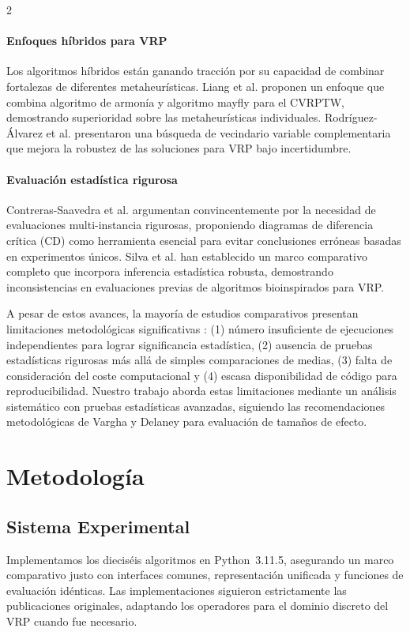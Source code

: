 \documentclass[10pt,a4paper]{extarticle}
\begin{document}
{\begin{multicols}{2}
\paragraph{Enfoques híbridos para VRP} Los algoritmos híbridos están ganando tracción por su capacidad de combinar fortalezas de diferentes metaheurísticas. Liang et al. \cite{Liang2023HHMM} proponen un enfoque que combina algoritmo de armonía y algoritmo mayfly para el CVRPTW, demostrando superioridad sobre las metaheurísticas individuales. Rodríguez-Álvarez et al. \cite{Rodriguez2024CSVNS} presentaron una búsqueda de vecindario variable complementaria que mejora la robustez de las soluciones para VRP bajo incertidumbre.

\paragraph{Evaluación estadística rigurosa} Contreras-Saavedra et al. \cite{Contreras2024CD} argumentan convincentemente por la necesidad de evaluaciones multi-instancia rigurosas, proponiendo diagramas de diferencia crítica (CD) como herramienta esencial para evitar conclusiones erróneas basadas en experimentos únicos. Silva et al. \cite{Silva2023VRP} han establecido un marco comparativo completo que incorpora inferencia estadística robusta, demostrando inconsistencias en evaluaciones previas de algoritmos bioinspirados para VRP.

A pesar de estos avances, la mayoría de estudios comparativos presentan limitaciones metodológicas significativas \cite{Li2020SMA}: (1) número insuficiente de ejecuciones independientes para lograr significancia estadística, (2) ausencia de pruebas estadísticas rigurosas más allá de simples comparaciones de medias, (3) falta de consideración del coste computacional y (4) escasa disponibilidad de código para reproducibilidad. Nuestro trabajo aborda estas limitaciones mediante un análisis sistemático con pruebas estadísticas avanzadas, siguiendo las recomendaciones metodológicas de Vargha y Delaney \cite{Vargha2000} para evaluación de tamaños de efecto.

\section{Metodología}\label{sec:metodologia}
\subsection{Sistema Experimental}
Implementamos los dieciséis algoritmos en Python~3.11.5, asegurando un marco comparativo justo con interfaces comunes, representación unificada y funciones de evaluación idénticas. Las implementaciones siguieron estrictamente las publicaciones originales, adaptando los operadores para el dominio discreto del VRP cuando fue necesario.


\end{multicols}}
\end{document}
